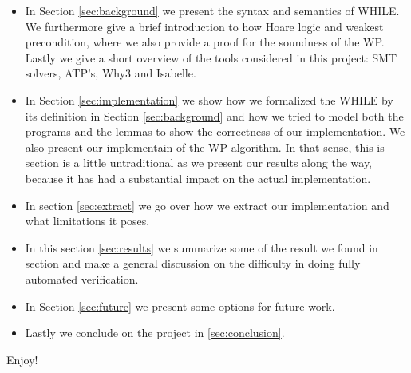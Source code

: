 \begin{itemize}
  \item In Section \ref{sec:background} we present the syntax and semantics of WHILE.
        We furthermore give a brief introduction to how Hoare logic and weakest precondition, where we also provide a proof for the soundness of the WP.
        Lastly we give a short overview of the tools considered in this project: SMT solvers, ATP's, Why3 and Isabelle.
  \item In Section \ref{sec:implementation} we show how we formalized the WHILE by its definition in Section \ref{sec:background} and how we tried to model both the programs and the lemmas to show the correctness of our implementation. We also present our implementain of the WP algorithm.
        In that sense, this is section is a little untraditional as we present our results along the way, because it has had a substantial impact on the actual implementation.
  \item In section \ref{sec:extract} we go over how we extract our implementation and what limitations it poses.
  \item In this section \ref{sec:results} we summarize some of the result we found in section and make a general discussion on the difficulty in doing fully automated verification.
  \item In Section \ref{sec:future} we present some options for future work.
  \item Lastly we conclude on the project in \ref{sec:conclusion}.
\end{itemize}

Enjoy!